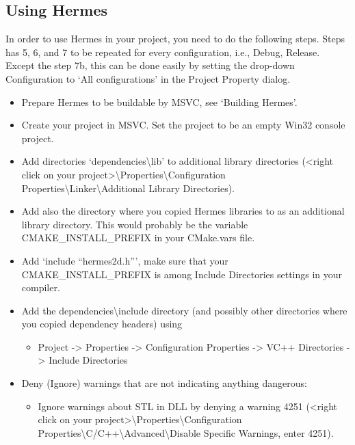 \documentclass[a4paper,0pt,english]{sphinxmanual}
\begin{document}
\subsection{Using Hermes}
\label{src/installation/win:using-hermes}
In order to use Hermes in your project, you need to do the following steps. Steps has 5, 6, and 7 to be repeated for every configuration, i.e., Debug, Release. Except the step 7b, this can be done easily by setting the drop-down Configuration to `All configurations' in the Project Property dialog.
\begin{itemize}
\item {} 
Prepare Hermes to be buildable by MSVC, see `Building Hermes'.

\item {} 
Create your project in MSVC. Set the project to be an empty Win32 console project.

\item {} 
Add directories `dependencies\textbackslash{}lib' to additional library directories (\textless{}right click on your project\textgreater{}\textbackslash{}Properties\textbackslash{}Configuration Properties\textbackslash{}Linker\textbackslash{}Additional Library Directories).

\item {} 
Add also the directory where you copied Hermes libraries to as an additional library directory. This would probably be the variable CMAKE\_INSTALL\_PREFIX in your CMake.vars file.

\item {} 
Add `include ``hermes2d.h''', make sure that your CMAKE\_INSTALL\_PREFIX is among Include Directories settings in your compiler.

\item {} 
Add the dependencies\textbackslash{}include directory (and possibly other directories where you copied dependency headers) using
\begin{itemize}
\item {} 
Project -\textgreater{} Properties -\textgreater{} Configuration Properties -\textgreater{} VC++ Directories -\textgreater{} Include Directories

\end{itemize}

\item {} 
Deny (Ignore) warnings that are not indicating anything dangerous:
\begin{itemize}
\item {} 
Ignore warnings about STL in DLL by denying a warning 4251 (\textless{}right click on your project\textgreater{}\textbackslash{}Properties\textbackslash{}Configuration Properties\textbackslash{}C/C++\textbackslash{}Advanced\textbackslash{}Disable Specific Warnings, enter 4251).


\end{itemize}
\end{itemize}
\end{document}
